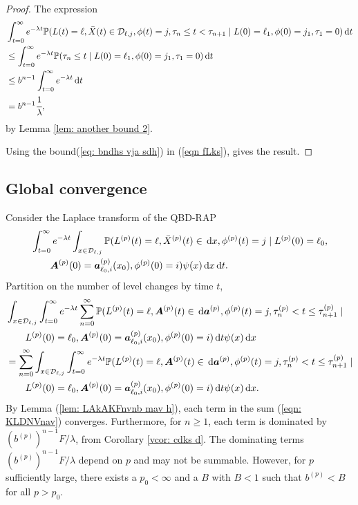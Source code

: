 \begin{proof}
	The expression 
	\begin{align}
		&\int_{t=0}^\infty e^{-\lambda t} \mathbb P(L(t) = \ell, \bar X(t)\in\mathcal D_{\ell,j}, \phi(t) = j, \tau_{n}\leq t<\tau_{n+1} \nonumber
		\mid L(0)=\ell_1,\phi(0)=j_1, \tau_1=0) \, \mathrm{d} t
		\\&\leq \int_{t=0}^\infty e^{-\lambda t} \mathbb P(\tau_{n}\leq t \nonumber
		\mid L(0)=\ell_1,\phi(0)=j_1, \tau_1=0) \, \mathrm{d} t
		\\&\leq b^{n-1}\int_{t=0}^\infty e^{-\lambda t} \, \mathrm{d} t \nonumber 
		\\&=b^{n-1}\cfrac{1}{\lambda}, \label{eq: bndhs vja sdh}
	\end{align}
	by Lemma \ref{lem: another bound 2}.
	
	Using the bound(\ref{eq: bndhs vja sdh}) in (\ref{eqn fLks}), gives the result.  
\end{proof}

\subsection{Global convergence}
Consider the Laplace transform of the QBD-RAP 
\begin{align}
	&\int_{t=0}^\infty e^{-\lambda t}\int_{x\in\mathcal D_{\ell,j}}\mathbb P(L^{(p)}(t) = \ell, \bar X^{(p)}(t) \in \, \mathrm{d} x, \phi^{(p)}(t) = j \mid L^{(p)}(0)=\ell_0, \nonumber 
	\\&\qquad{} \boldsymbol A^{(p)}(0)=\boldsymbol  a_{\ell_0,i}^{(p)}(x_0), \phi^{(p)}(0)=i)  \psi(x)\, \mathrm{d} x\, \mathrm{d} t.
\end{align}
Partition on the number of level changes by time \(t\), 
\begin{align}
	&\int_{x\in\mathcal D_{\ell,j}} \int_{t=0}^\infty e^{-\lambda t}\sum_{n=0}^\infty \mathbb P(L^{(p)}(t) = \ell, \boldsymbol A^{(p)}(t) \in \, \mathrm{d} \boldsymbol a^{(p)}, \phi^{(p)}(t) = j, \tau_{n}^{(p)}< t \leq\tau_{n+1}^{(p)} \mid\nonumber 
	\\&\qquad{} L^{(p)}(0)=\ell_0, \boldsymbol A^{(p)}(0)=\boldsymbol  a_{\ell_0,i}^{(p)}(x_0), \phi^{(p)}(0)=i)\, \mathrm{d} t \psi(x)\, \mathrm{d} x \nonumber
	\\&=\sum_{n=0}^\infty\int_{x\in\mathcal D_{\ell,j}}\int_{t=0}^\infty e^{-\lambda t} \mathbb P(L^{(p)}(t) = \ell, \boldsymbol A^{(p)}(t) \in \, \mathrm{d} \boldsymbol a^{(p)}, \phi^{(p)}(t) = j, \tau_{n}^{(p)}< t \leq\tau_{n+1}^{(p)} \mid \nonumber 
	\\&\qquad{}L^{(p)}(0)=\ell_0, \boldsymbol A^{(p)}(0)=\boldsymbol  a_{\ell_0,i}^{(p)}(x_0), \phi^{(p)}(0)=i)\, \mathrm{d} t \psi(x) \, \mathrm{d} x. \label{eqn: KLDNVnav}
\end{align}
By Lemma (\ref{lem: LAkAKFnvnb mav h}), each term in the sum (\ref{eqn: KLDNVnav}) converges. Furthermore, for \(n\geq 1\), each term is dominated by \(\left(b^{(p)}\right)^{n-1}F/\lambda\), from Corollary \ref{vcor: cdks d}. The dominating terms \(\left(b^{(p)}\right)^{n-1}F/\lambda\) depend on \(p\) and may not be summable. However, for \(p\) sufficiently large, there exists a \(p_0<\infty\) and a \(B\) with \(B<1\) such that \(b^{(p)}<B\) for all \(p>p_0\). 

